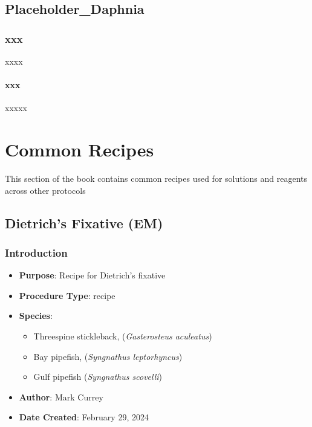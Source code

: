 \documentclass[
  letterpaper,
  DIV=11,
  numbers=noendperiod]{scrreprt}
\providecommand{\tightlist}{%
  \setlength{\itemsep}{0pt}\setlength{\parskip}{0pt}}\usepackage{longtable,booktabs,array}
\begin{document}
\hypertarget{sec-Daphnia}{%
\chapter{Placeholder\_Daphnia}\label{sec-Daphnia}}

\hypertarget{xxx-2}{%
\section{xxx}\label{xxx-2}}

xxxx

\hypertarget{xxx-3}{%
\subsection{xxx}\label{xxx-3}}

xxxxx

\part{Common Recipes}

This section of the book contains common recipes used for solutions and
reagents across other protocols

\hypertarget{sec-recipe_dietrichs_fix}{%
\chapter{Dietrich's Fixative (EM)}\label{sec-recipe_dietrichs_fix}}

\hypertarget{introduction-65}{%
\section{Introduction}\label{introduction-65}}

\begin{itemize}
\tightlist
\item
  \textbf{Purpose}: Recipe for Dietrich's fixative
\item
  \textbf{Procedure Type}: recipe
\item
  \textbf{Species}:

  \begin{itemize}
  \tightlist
  \item
    Threespine stickleback, (\emph{Gasterosteus aculeatus})
  \item
    Bay pipefish, (\emph{Syngnathus leptorhyncus})
  \item
    Gulf pipefish (\emph{Syngnathus scovelli})
  \end{itemize}
\item
  \textbf{Author}: Mark Currey
\item
  \textbf{Date Created}: February 29, 2024
\end{itemize}
\end{document}
